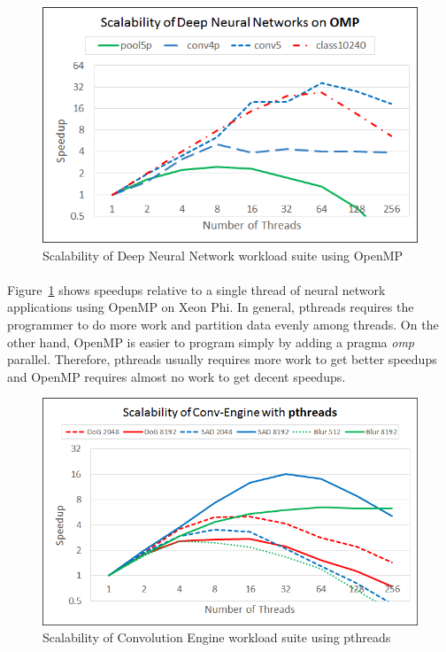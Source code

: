 \begin{figure}
  \begin{center}
    \includegraphics[width=\linewidth]{cs758-figs/scalability-dnn-omp.png}
  \end{center}
\vspace{-0.2in}
  \caption{Scalability of Deep Neural Network workload suite using OpenMP}
  \label{fig:scalability-dnn-omp}
\vspace{-0.05in}
\end{figure}

\paragraph{}
Figure~\ref{fig:scalability-dnn-omp} shows speedups relative to a single thread 
of neural network applications using OpenMP on Xeon Phi. In general, pthreads 
requires the programmer to do more work and partition data evenly among threads. 
On the other hand, OpenMP is easier to program simply by adding a pragma \emph{omp} 
parallel. Therefore, pthreads usually requires more work to get better speedups 
and OpenMP requires almost no work to get decent speedups. 


\begin{figure}
  \begin{center}
    \includegraphics[width=\linewidth]{cs758-figs/scalability-convEngine-pthread.png}
  \end{center}
\vspace{-0.2in}
  \caption{Scalability of Convolution Engine workload suite using pthreads}
  \label{fig:scalability-convEngine-pthread}
\vspace{-0.05in}
\end{figure}

